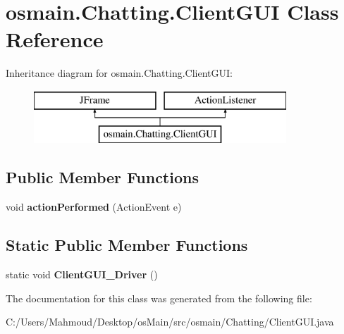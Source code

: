 \hypertarget{classosmain_1_1_chatting_1_1_client_g_u_i}{}\section{osmain.\+Chatting.\+Client\+G\+UI Class Reference}
\label{classosmain_1_1_chatting_1_1_client_g_u_i}
Inheritance diagram for osmain.\+Chatting.\+Client\+G\+UI\+:\begin{figure}[H]
\begin{center}
\leavevmode
\includegraphics[height=2.000000cm]{classosmain_1_1_chatting_1_1_client_g_u_i}
\end{center}
\end{figure}
\subsection*{Public Member Functions}
\begin{DoxyCompactItemize}
\item 
void {\bfseries action\+Performed} (Action\+Event e)\hypertarget{classosmain_1_1_chatting_1_1_client_g_u_i_aa113754d096807df145c5c98b8909a7b}{}\label{classosmain_1_1_chatting_1_1_client_g_u_i_aa113754d096807df145c5c98b8909a7b}

\end{DoxyCompactItemize}
\subsection*{Static Public Member Functions}
\begin{DoxyCompactItemize}
\item 
static void {\bfseries Client\+G\+U\+I\+\_\+\+Driver} ()\hypertarget{classosmain_1_1_chatting_1_1_client_g_u_i_a2b8416b246420ef0e044b63ef6a32d40}{}\label{classosmain_1_1_chatting_1_1_client_g_u_i_a2b8416b246420ef0e044b63ef6a32d40}

\end{DoxyCompactItemize}


The documentation for this class was generated from the following file\+:\begin{DoxyCompactItemize}
\item 
C\+:/\+Users/\+Mahmoud/\+Desktop/os\+Main/src/osmain/\+Chatting/Client\+G\+U\+I.\+java\end{DoxyCompactItemize}
